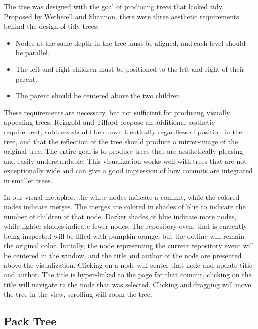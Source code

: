 The \rt{} tree was designed with the goal of producing trees that looked
tidy. Proposed by Wetherell and Shannon\cite{Wetherell1979}, there were
three aesthetic requirements behind the design of tidy trees:

\begin{itemize}
  \item

    Nodes at the same depth in the tree must be aligned, and each level
    should be parallel.

  \item

    The left and right children must be positioned to the left and right
    of their parent.

  \item

    The parent should be centered above the two children.

\end{itemize}

These requirements are necessary, but not sufficient for producing
visually appealing trees. Reingold and Tilford propose an additional
aesthetic requirement; subtrees should be drawn identically regardless
of position in the tree, and that the reflection of the tree should
produce a mirror-image of the original tree. The entire goal is to
produce trees that are aesthetically pleasing and easily understandable.
This visualization works well with trees that are not exceptionally
wide and can give a good impression of how commits are integrated in
smaller trees.

In our visual metaphor, the white nodes indicate a commit, while the
colored nodes indicate merges. The merges are colored in shades of blue
to indicate the number of children of that node. Darker shades of blue
indicate more nodes, while lighter shades indicate fewer nodes. The
repository event that is currently being inspected will be filled with
pumpkin orange, but the outline will remain the original color.
Initially, the node representing the current repository event will be
centered in the window, and the title and author of the node are
presented above the visualization. Clicking on a node will center that
node and update title and author. The title is hyper-linked to the page
for that commit, clicking on the title will navigate to the node that
was selected. Clicking and dragging will move the tree in the view,
scrolling will zoom the tree.

\subsection{Pack Tree}
\label{sub:pack_tree}

